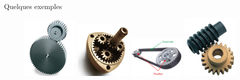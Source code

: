 \documentclass{beamer}
\begin{document}
    \begin{frame}{Quelques exemples}
      \centering
      \begin{figure}[h]
        \centering
          \includegraphics[width=0.24\textwidth]{images/engr_droit}
          \includegraphics[width=0.24\textwidth]{images/engr_epi}
          \includegraphics[width=0.24\textwidth]{images/poulie-courroie}
          \includegraphics[width=0.24\textwidth]{images/roue_vis}\\


\end{figure}
\end{frame}
\end{document}
